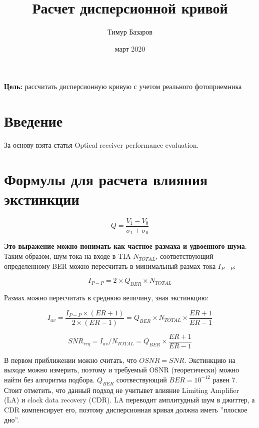 \documentclass{article}
\title{Расчет дисперсионной кривой}
\author{Тимур Базаров}
\date{март 2020}
\begin{document}
\maketitle

\textbf{Цель:} рассчитать дисперсионную кривую с учетом реального фотоприемника


\section{Введение}
За основу взята статья Optical receiver performance evaluation.

\section{Формулы для расчета влияния экстинкции}

\begin{equation}
    Q=\frac{V_1-V_0}{\sigma_1+\sigma_0}
\end{equation}

\textbf{Это выражение можно понимать как частное размаха и удвоенного шума}.
Таким образом, шум тока на входе в TIA $N_{TOTAL}$, соответствующий определенному BER можно пересчитать в минимальный размах тока $I_{P-P}$:

\begin{equation}
    I_{P-P}=2\times Q_{BER}\times N_{TOTAL}
\end{equation}

Размах можно пересчитать в среднюю величину, зная экстинкцию:

\begin{equation}
    I_{av}=\frac{I_{P-P}\times(ER+1)}{2\times(ER-1)}=Q_{BER}\times N_{TOTAL}\times\frac{ER+1}{ER-1}
\end{equation}

\begin{equation}
    SNR_{req}=I_{av}/N_{TOTAL}=Q_{BER}\times\frac{ER+1}{ER-1}
\end{equation}

В первом приближении можно считать, что $OSNR=SNR$. Экстинкцию на выходе можно измерить, поэтому и требуемый OSNR (теоретически) можно найти без алгоритма подбора. $Q_{BER}$ соотвествующий $BER=10^{-12}$ равен 7. 
Стоит отметить, что данный подход не учитывет влияние Limiting Amplifier (LA) и clock data recovery (CDR). LA переводит амплитудный шум в джиттер, а CDR компенсирует его, поэтому дисперсионная кривая должна иметь ''плоское дно''.
\end{document}
